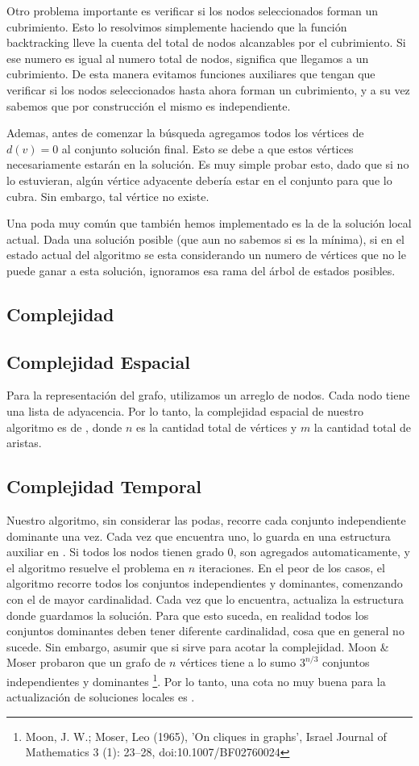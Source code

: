 Otro problema importante es verificar si los nodos seleccionados forman un cubrimiento. Esto lo resolvimos simplemente haciendo que la función backtracking lleve la cuenta del total de nodos alcanzables por el cubrimiento. Si ese numero es igual al numero total de nodos, significa que llegamos a un cubrimiento. De esta manera evitamos funciones auxiliares que tengan que verificar si los nodos seleccionados hasta ahora forman un cubrimiento, y a su vez sabemos que por construcción el mismo es independiente.

Ademas, antes de comenzar la búsqueda agregamos todos los vértices de $d(v) = 0$ al conjunto solución final. Esto se debe a que estos vértices necesariamente estarán en la solución. Es muy simple probar esto, dado que si no lo estuvieran, algún vértice adyacente debería estar en el conjunto para que lo cubra. Sin embargo, tal vértice no existe.

Una poda muy común que también hemos implementado es la de la solución local actual. Dada una solución posible (que aun no sabemos si es la mínima), si en el estado actual del algoritmo se esta considerando un numero de vértices que no le puede ganar a esta solución, ignoramos esa rama del árbol de estados posibles.

\subsection{Complejidad}

\subsection{Complejidad Espacial}
Para la representación del grafo, utilizamos un arreglo de nodos. Cada nodo tiene una lista de adyacencia. Por lo tanto, la complejidad espacial de nuestro algoritmo es de , donde $n$ es la cantidad total de vértices y $m$ la cantidad total de aristas.

\subsection{Complejidad Temporal}
Nuestro algoritmo, sin considerar las podas, recorre cada conjunto independiente dominante una vez. Cada vez que encuentra uno, lo guarda en una estructura auxiliar en . Si todos los nodos tienen grado 0, son agregados automaticamente, y el algoritmo resuelve el problema en $n$ iteraciones.
En el peor de los casos, el algoritmo recorre todos los conjuntos independientes y dominantes, comenzando con el de mayor cardinalidad. Cada vez que lo encuentra, actualiza la estructura donde guardamos la solución. Para que esto suceda, en realidad todos los conjuntos dominantes deben tener diferente cardinalidad, cosa que en general no sucede. Sin embargo, asumir que si sirve para acotar la complejidad. Moon \& Moser probaron que un grafo de $n$ vértices tiene a lo sumo $3^{n/3}$ conjuntos independientes y dominantes 
\footnote{Moon, J. W.; Moser, Leo (1965), 'On cliques in graphs', Israel Journal of Mathematics 3 (1): 23–28, doi:10.1007/BF02760024}. Por lo tanto, una cota no muy buena para la actualización de soluciones locales es .

